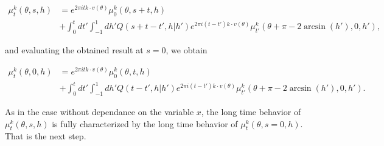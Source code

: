 \documentclass[a4paper,10pt,reqno]{amsart}
\numberwithin{equation}{subsection}
\numberwithin{figure}{subsection}
\begin{document}
{\footnotesize\begin{align}
\nonumber\mu_t^k(\theta,s,h)&=e^{2\pi itk\cdot v(\theta)}\mu_0^k(\theta,s+t,h)
\\
\label{rapp:ev_mutk}&+\int_0^tdt'\int_{-1}^1dh'Q(s+t-t',h|h')e^{2\pi i(t-t')k\cdot v(\theta)}\mu_{t'}^k(\theta+\pi-2\arcsin(h'),0,h'),
\end{align}}

and evaluating the obtained result at $s=0$, we obtain

\begin{align}
\nonumber\mu_t^k(\theta,0,h)&=e^{2\pi itk\cdot v(\theta)}\mu_0^k(\theta,t,h)
\\
\label{rapp:ev_mutk_s=0}&+\int_0^tdt'\int_{-1}^1dh'Q(t-t',h|h')e^{2\pi i(t-t')k\cdot v(\theta)}\mu_{t'}^k(\theta+\pi-2\arcsin(h'),0,h').
\end{align}

As in the case without dependance on the variable $x$, the long time behavior of $\mu_t^k(\theta,s,h)$ is fully characterized by the long time behavior of $\mu_t^k(\theta,s=0,h)$. That is the next step.
\newline
\end{document}
